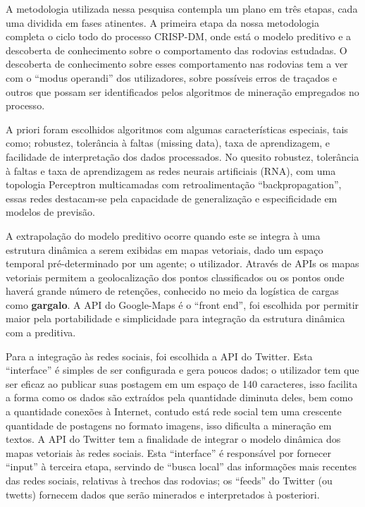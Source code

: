 A metodologia utilizada nessa pesquisa contempla um plano em três etapas, cada uma dividida em fases atinentes.
A primeira etapa da nossa metodologia completa o ciclo todo do processo CRISP-DM, onde está o modelo preditivo e 
a descoberta de conhecimento sobre o comportamento das rodovias estudadas. O descoberta de conhecimento sobre esses comportamento 
nas rodovias tem a ver com o ``modus operandi'' dos utilizadores, sobre possíveis erros de traçados e outros que possam
ser identificados pelos algoritmos de mineração empregados no processo.

A priori foram escolhidos algoritmos com algumas características especiais, tais como; robustez, tolerância à faltas (missing data),
taxa de aprendizagem, e facilidade de interpretação dos dados processados. 
No quesito robustez, tolerância à faltas e taxa de aprendizagem as redes neurais artificiais (RNA), com uma 
topologia Perceptron multicamadas com retroalimentação ``backpropagation'', essas redes destacam-se pela capacidade de generalização e 
especificidade em modelos de previsão. 

A extrapolação do modelo preditivo ocorre quando este se integra à uma estrutura dinâmica a serem exibidas em mapas vetoriais, 
dado um espaço temporal pré-determinado por um agente; o utilizador. 
Através de APIs os mapas vetoriais permitem a geolocalização dos pontos classificados ou os pontos onde haverá grande número de 
retenções, conhecido no meio da logística de cargas como \textbf{gargalo}.
A API do Google-Maps é o ``front end'', foi escolhida por permitir maior pela portabilidade e simplicidade para integração da estrutura
dinâmica com a preditiva.

Para a integração às redes sociais, foi escolhida a API do Twitter. Esta ``interface'' é simples de ser configurada e gera poucos dados; 
o utilizador tem que ser eficaz ao publicar suas postagem em um espaço de 140 caracteres, isso facilita a forma como os dados são
extraídos pela quantidade diminuta deles, bem como a quantidade conexões à Internet, contudo está rede social tem uma crescente quantidade
de postagens no formato imagens, isso dificulta a mineração em textos.
A API do Twitter tem a finalidade de integrar o modelo dinâmica dos mapas vetoriais às redes sociais. 
Esta ``interface'' é responsável por fornecer ``input'' à terceira etapa, servindo de ``busca local'' das informações mais recentes das 
redes sociais, relativas à trechos das rodovias; os ``feeds'' do Twitter (ou twetts) fornecem dados que serão minerados e interpretados à posteriori.

